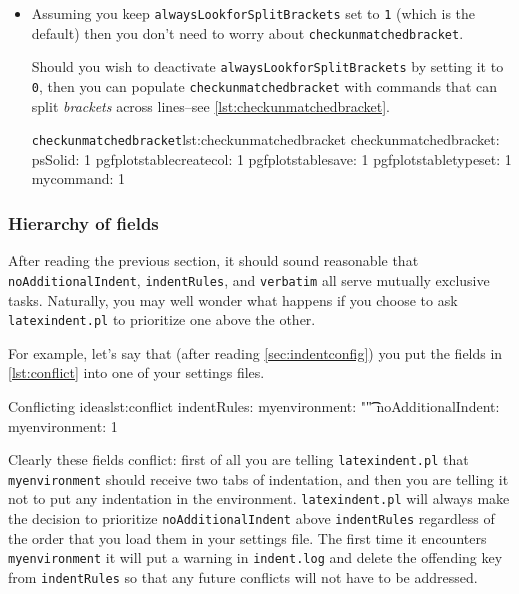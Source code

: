 \documentclass[11pt]{article}
\newcommand{\verbitem}[1]{\small\PVerb{#1}}
\begin{document}
\begin{itemize}
	      \begin{cmhlistings}[style=yaml]{\lstinline!checkunmatchedELSE!}{lst:checkunmatchedELSE}
checkunmatchedELSE:
    pgfkeysifdefined: 1
    DTLforeach: 1
    ifthenelse: 1
	\end{cmhlistings}
	\item[\color{red}\verbitem{checkunmatchedbracket}] Assuming you keep \lstinline!alwaysLookforSplitBrackets!
	      set to \lstinline!1! (which is the default) then you don't need to worry about \lstinline!checkunmatchedbracket!.

	      Should you wish to deactivate \lstinline!alwaysLookforSplitBrackets! by setting it
	      to \lstinline!0!, then you can populate \lstinline!checkunmatchedbracket! with commands that can
	      split \emph{brackets} across lines--see \cref{lst:checkunmatchedbracket}.

	      \begin{cmhlistings}[style=yaml]{\lstinline!checkunmatchedbracket!}{lst:checkunmatchedbracket}
checkunmatchedbracket:
    psSolid: 1
    pgfplotstablecreatecol: 1
    pgfplotstablesave: 1
    pgfplotstabletypeset: 1
    mycommand: 1
	\end{cmhlistings}
\end{itemize}

\subsubsection{Hierarchy of fields}\label{sec:fieldhierachy}
After reading the previous section, it should sound reasonable that
\lstinline!noAdditionalIndent!, \lstinline!indentRules!, and
\lstinline!verbatim! all serve mutually exclusive tasks. Naturally, you may
well wonder what happens if you choose to ask \lstinline!latexindent.pl! to
prioritize one above the other.

For example, let's say that (after reading \cref{sec:indentconfig}) you put the fields in \cref{lst:conflict} into
one of your settings files.
\begin{cmhlistings}[style=yaml]{Conflicting ideas}{lst:conflict}
indentRules:
   myenvironment: "\t\t"
noAdditionalIndent:
   myenvironment: 1
\end{cmhlistings}

Clearly these fields conflict: first of all
you are telling \lstinline!latexindent.pl! that \lstinline!myenvironment! should
receive two tabs of indentation, and then you are telling it
not to put any indentation in the environment. \lstinline!latexindent.pl!
will always make the decision to prioritize \lstinline!noAdditionalIndent! above
\lstinline!indentRules! regardless of the order that you load them in
your settings file. The first
time it encounters \lstinline!myenvironment! it will put a warning in \lstinline!indent.log!
and delete the offending key from \lstinline!indentRules! so that any future
conflicts will not have to be addressed.
\end{document}
